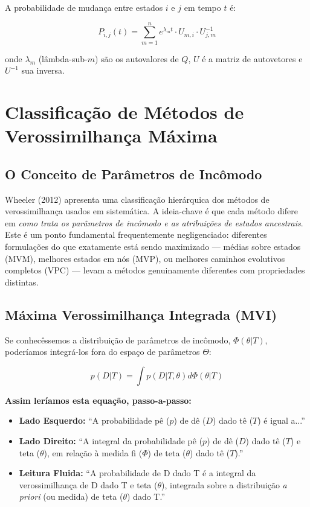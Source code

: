 A probabilidade de mudança entre estados $i$ e $j$ em tempo $t$ é:

$$P_{i,j}(t) = \sum_{m=1}^{n} e^{\lambda_m t} \cdot U_{m,i} \cdot U^{-1}_{j,m}$$

onde $\lambda_m$ (lâmbda-sub-$m$) são os autovalores de $Q$, $U$ é a matriz de autovetores e $U^{-1}$ sua inversa.

\section{Classificação de Métodos de Verossimilhança Máxima}

\subsection{O Conceito de Parâmetros de Incômodo}

Wheeler (2012) apresenta uma classificação hierárquica dos métodos de verossimilhança usados em sistemática. A ideia-chave é que cada método difere em \textit{como trata os parâmetros de incômodo e as atribuições de estados ancestrais}. Este é um ponto fundamental frequentemente negligenciado: diferentes formulações do que exatamente está sendo maximizado --- médias sobre estados (MVM), melhores estados em nós (MVP), ou melhores caminhos evolutivos completos (VPC) --- levam a métodos genuinamente diferentes com propriedades distintas.

\subsection{Máxima Verossimilhança Integrada (MVI)}

Se conhecêssemos a distribuição de parâmetros de incômodo, $\Phi(\theta|T)$, poderíamos integrá-los fora do espaço de parâmetros $\Theta$:

$$p(D|T) = \int p(D|T, \theta) d\Phi(\theta|T)$$

\textbf{Assim leríamos esta equação, passo-a-passo:}

\begin{itemize}
    \item \textbf{Lado Esquerdo:} ``A probabilidade pê ($p$) de dê ($D$) dado tê ($T$) é igual a...''
    \item \textbf{Lado Direito:} ``A integral da probabilidade pê ($p$) de dê ($D$) dado tê ($T$) e teta ($\theta$), em relação à medida fi ($\Phi$) de teta ($\theta$) dado tê ($T$).''
    \item \textbf{Leitura Fluida:} ``A probabilidade de D dado T é a integral da verossimilhança de D dado T e teta ($\theta$), integrada sobre a distribuição \textit{a priori} (ou medida) de teta ($\theta$) dado T.''
\end{itemize}


